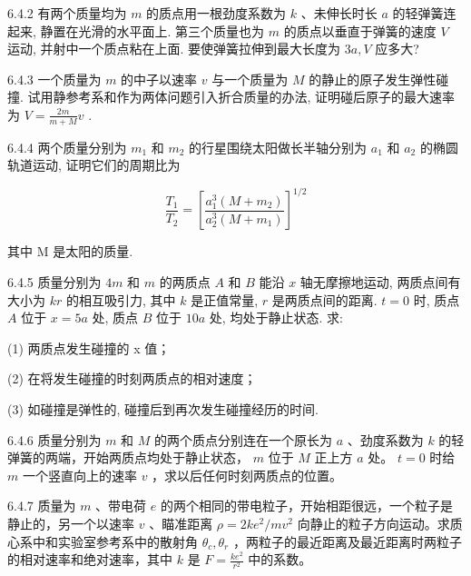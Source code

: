 \begin{problem}{6.4.2}
有两个质量均为 $m$ 的质点用一根劲度系数为 $k$ 、未伸长时长 $a$ 的轻弹簧连起来, 静置在光滑的水平面上. 第三个质量也为 $m$ 的质点以垂直于弹簧的速度 $V$ 运动, 并射中一个质点粘在上面. 要使弹簧拉伸到最大长度为 $3a, V$ 应多大?
\end{problem}
\clearpage


\begin{problem}{6.4.3}
一个质量为 $m$ 的中子以速率 $v$ 与一个质量为 $M$ 的静止的原子发生弹性碰撞. 试用静参考系和作为两体问题引入折合质量的办法, 证明碰后原子的最大速率为 $V = \frac{2m}{m + M} v$ .
\end{problem}
\clearpage


\begin{problem}{6.4.4}
两个质量分别为 $m_{1}$ 和 $m_{2}$ 的行星围绕太阳做长半轴分别为 $a_{1}$ 和 $a_{2}$ 的椭圆轨道运动, 证明它们的周期比为

\[
\frac {T _ {1}}{T _ {2}} = \left[ \frac {a _ {1} ^ {3} (M + m _ {2})}{a _ {2} ^ {3} (M + m _ {1})} \right] ^ {1 / 2}
\]

其中 M 是太阳的质量.
\end{problem}
\clearpage


\begin{problem}{6.4.5}
质量分别为 $4m$ 和 $m$ 的两质点 $A$ 和 $B$ 能沿 $x$ 轴无摩擦地运动, 两质点间有大小为 $kr$ 的相互吸引力, 其中 $k$ 是正值常量, $r$ 是两质点间的距离. $t = 0$ 时, 质点 $A$ 位于 $x = 5a$ 处, 质点 $B$ 位于 $10a$ 处, 均处于静止状态. 求:

(1) 两质点发生碰撞的 x 值；

(2) 在将发生碰撞的时刻两质点的相对速度；

(3) 如碰撞是弹性的, 碰撞后到再次发生碰撞经历的时间.
\end{problem}
\clearpage


\begin{problem}{6.4.6}
质量分别为 $m$ 和 $M$ 的两个质点分别连在一个原长为 $a$ 、劲度系数为 $k$ 的轻弹簧的两端，开始两质点均处于静止状态， $m$ 位于 $M$ 正上方 $a$ 处。 $t = 0$ 时给 $m$ 一个竖直向上的速率 $v$ ，求以后任何时刻两质点的位置。
\end{problem}
\clearpage


\begin{problem}{6.4.7}
质量为 $m$ 、带电荷 $e$ 的两个相同的带电粒子，开始相距很远，一个粒子是静止的，另一个以速率 $v$ 、瞄准距离 $\rho = 2ke^2 / mv^2$ 向静止的粒子方向运动。求质心系中和实验室参考系中的散射角 $\theta_c, \theta_r$ ，两粒子的最近距离及最近距离时两粒子的相对速率和绝对速率，其中 $k$ 是 $F = \frac{ke^2}{r^2}$ 中的系数。
\end{problem}
\clearpage


